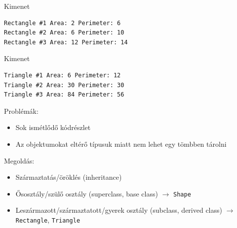 \documentclass[usenames,dvipsnames,aspectratio=169]{beamer}
\begin{document}
\begin{frame}[fragile]
    \begin{exampleblock}{}
        \vspace{-.2cm}
        \fontsize{7}{8} \selectfont
        
        \vspace{-.2cm}
    \end{exampleblock}
    \begin{block}{Kimenet}
        \vspace{-.4cm}
        \fontsize{7}{8} \selectfont
        \begin{verbatim}
Rectangle #1 Area: 2 Perimeter: 6
Rectangle #2 Area: 6 Perimeter: 10
Rectangle #3 Area: 12 Perimeter: 14
        \end{verbatim}
        \vspace{-.4cm}
    \end{block}
\end{frame}

\begin{frame}[fragile]
    \begin{exampleblock}{}
        \vspace{-.2cm}
        \scriptsize
        
        \vspace{-.2cm}
    \end{exampleblock}
    \begin{block}{Kimenet}
        \vspace{-.4cm}
        \scriptsize
        \begin{verbatim}
Triangle #1 Area: 6 Perimeter: 12
Triangle #2 Area: 30 Perimeter: 30
Triangle #3 Area: 84 Perimeter: 56
        \end{verbatim}
        \vspace{-.4cm}
    \end{block}
\end{frame}

\begin{frame}
    Problémák:
    \begin{itemize}
        \item Sok ismétlődő kódrészlet
        \item Az objektumokat eltérő típusuk miatt nem lehet egy tömbben tárolni
    \end{itemize}
    Megoldás:
    \begin{itemize}
        \item Származtatás/öröklés (inheritance)
        \item Ősosztály/szülő osztály (superclass, base class) $\to$ \texttt{Shape}
        \item Leszármazott/származtatott/gyerek osztály (subclass, derived class) $\to$ \texttt{Rectangle}, \texttt{Triangle}
    \end{itemize}
\end{frame}
\end{document}
